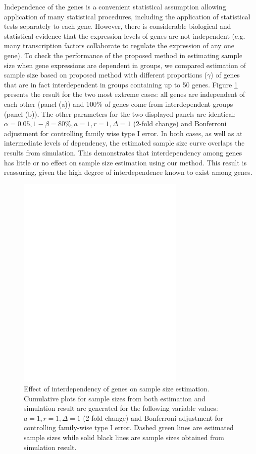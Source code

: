 \documentclass{bioinfo}
\begin{document}
Independence of the genes is a convenient statistical assumption
allowing application of many statistical procedures, including the
application of statistical tests separately to each gene. However,
there is considerable biological and statistical evidence that the
expression levels of genes are not independent (e.g. many
transcription factors collaborate to regulate the expression of any
one gene). To check the performance of the proposed method in
estimating sample size when gene expressions are dependent in
groups, we compared estimation of sample size based on proposed
method with different proportions ($\gamma$) of genes that are in
fact interdependent in groups containing up to 50 genes. Figure
\ref{fig:ResDep} presents the result for the two most extreme cases:
all genes are independent of each other (panel (a)) and 100\% of
genes come from interdependent groups (panel (b)). The other
parameters for the two displayed panels are identical: $\alpha =
0.05, 1 - \beta = 80\%, a = 1, r = 1, \Delta = 1$ (2-fold change)
and Bonferroni adjustment for controlling family wise type I
error. In both cases, as well as at intermediate levels of
dependency, the estimated sample size curve overlaps the results
from simulation.  This demonstrates that interdependency among genes
has little or no effect on sample size estimation using our
method. This result is reassuring, given the high degree of
interdependence known to exist among genes.

\begin{figure}[h]
  \centerline{\includegraphics*[width=3.2in]{ResDepF.pdf}} 
  \caption[Effect of interdependency of genes on sample size
    estimation] {Effect of interdependency of genes on sample size
    estimation.  Cumulative plots for sample sizes from both
    estimation and simulation result are generated for the following
    variable values: $a = 1, r = 1, \Delta = 1$ (2-fold change) and
    Bonferroni adjustment for controlling family-wise type I
    error. Dashed green lines are estimated sample sizes while solid
    black lines are sample sizes obtained from simulation result.}
  \label{fig:ResDep}
\end{figure}
\end{document}
